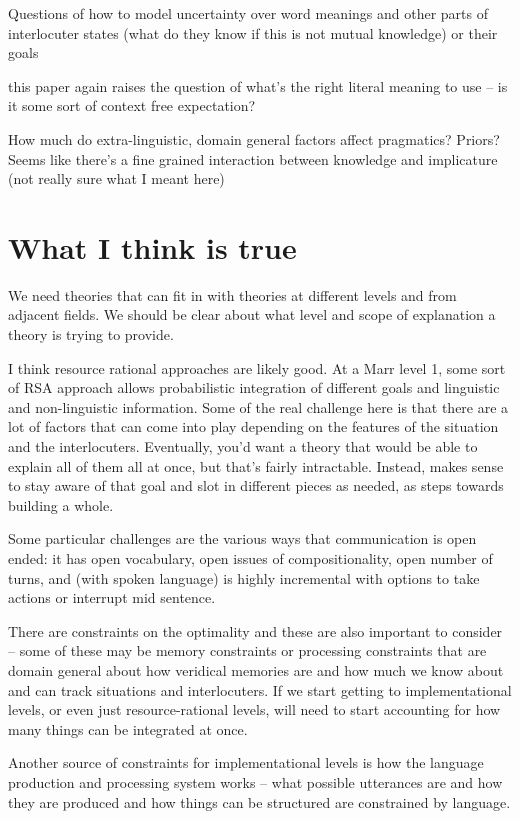 \documentclass[]{article}
\begin{document}
Questions of how to model uncertainty over word meanings and other parts of interlocuter states (what do they know if this is not mutual knowledge) or their goals

\cite{goodman2013} this paper again raises the question of what's the right literal meaning to use  -- is it some sort of context free expectation? 

How much do extra-linguistic, domain general factors affect pragmatics? Priors? Seems like there's a fine grained interaction between knowledge and implicature (not really sure what I meant here)

\section{What I think is true}

We need theories that can fit in with theories at different levels and from adjacent fields. We should be clear about what level and scope of explanation a theory is trying to provide. 

I think resource rational approaches are likely good. At a Marr level 1, some sort of RSA approach allows probabilistic integration of different goals and linguistic and non-linguistic information. Some of the real challenge here is that there are a lot of factors that can come into play depending on the features of the situation and the interlocuters. Eventually, you'd want a theory that would be able to explain all of them all at once, but that's fairly intractable. Instead, makes sense to stay aware of that goal and slot in different pieces as needed, as steps towards building a whole. 

Some particular challenges are the various ways that communication is open ended: it has open vocabulary, open issues of compositionality, open number of turns, and (with spoken language) is highly incremental with options to take actions or interrupt mid sentence. 

There are constraints on the optimality and these are also important to consider -- some of these may be memory constraints or processing constraints that are domain general about how veridical memories are and how much we know about and can track situations and interlocuters. If we start getting to implementational levels, or even just resource-rational levels, will need to start accounting for how many things can be integrated at once. 

Another source of constraints for implementational levels is how the language production and processing system works -- what possible utterances are and how they are produced and how things can be structured are constrained by language. 
\end{document}
